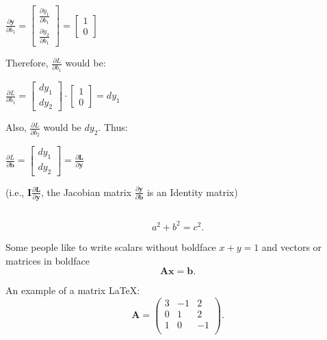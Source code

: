 \documentclass[12pt]{article}
\begin{document}
\begin{center}    
    $
    \frac{\partial\textbf{y}}{\partial b_{1}}=
    \left[\begin{matrix}
    \frac{\partial y_{1}}{\partial b_{1}} \\
    \frac{\partial y_{2}}{\partial b_{1}} 
    \end{matrix}\right]=
    \left[\begin{matrix}
    1\\
    0
    \end{matrix}\right]
    $
\end{center}Therefore, $\frac{\partial L}{\partial b_{1}}$ would be:
\begin{center}
    $
    \frac{\partial L}{\partial b_{1}}=
    \left[\begin{matrix}
    dy_{1} \\
    dy_{2}
    \end{matrix}\right]\cdot\left[\begin{matrix}
    1\\
    0
    \end{matrix}\right] = dy_{1}
    $
\end{center}Also, $\frac{\partial L}{\partial b_{2}}$ would be $dy_{2}$. Thus: 
\begin{center}
    $
    \frac{\partial L}{\partial \mathbf{b}}= 
    \left[\begin{matrix}
    dy_{1} \\
    dy_{2}
    \end{matrix}\right]=
    \frac{\partial\mathbf{L}}{\partial\mathbf{y}}
    $
    \begin{center}
        (i.e., $\mathbf{I}\frac{\partial\mathbf{L}}{\partial\mathbf{y}}$, the Jacobian matrix $\frac{\partial\mathbf{y}}{\partial\mathbf{b}}$ is an Identity matrix)
    \end{center}
\end{center}



\subsection*{}

\begin{equation*}
    a^2 + b^2 = c^2.
\end{equation*}

Some people like to write scalars without boldface $x+y=1$ and vectors or matrices in boldface
\begin{equation}
    \mathbf{A} \mathbf{x} = \mathbf{b}.
\end{equation}

An example of a matrix \LaTeX:
\begin{equation}
    \mathbf{A} = \left(
    \begin{array}{ccc}
    3 & -1 & 2 \\ 	
    0 & 1 & 2 \\ 
    1 & 0 & -1 \\
\end{array} 
\right).  
\end{equation}
\end{document}
